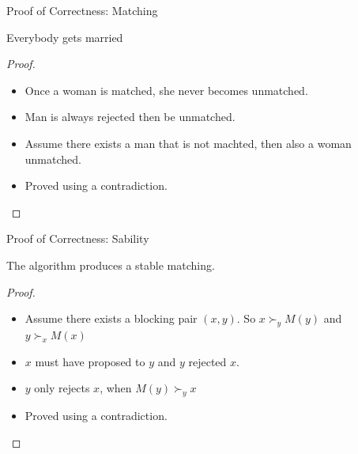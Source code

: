 \documentclass{beamer}
\begin{document}

\begin{frame}{Proof of Correctness: Matching}
\begin{theorem}
    Everybody gets married
\end{theorem} 
\begin{proof}
	\begin{itemize}
		\item Once a woman is matched, she never becomes unmatched.
		\item Man is always rejected then be unmatched.
		\item Assume there exists a man that is not machted, then also a woman unmatched.
		\item Proved using a contradiction.
	\end{itemize}
\end{proof}
\end{frame}






\begin{frame}{Proof of Correctness: Sability}
	\begin{theorem}
		The algorithm produces a stable matching.
	\end{theorem} 
	\begin{proof}
		\begin{itemize}
			\item Assume there exists a blocking pair $(x, y)$. So $x \succ_y M(y)$ and $y \succ_x M(x)$
			\item $x$ must have proposed to $y$ and $y$ rejected $x$.
			\item $y$ only rejects $x$, when $M(y) \succ_y x$
			\item Proved using a contradiction.
		\end{itemize}
	\end{proof}
	\end{frame}
	
\end{document}

